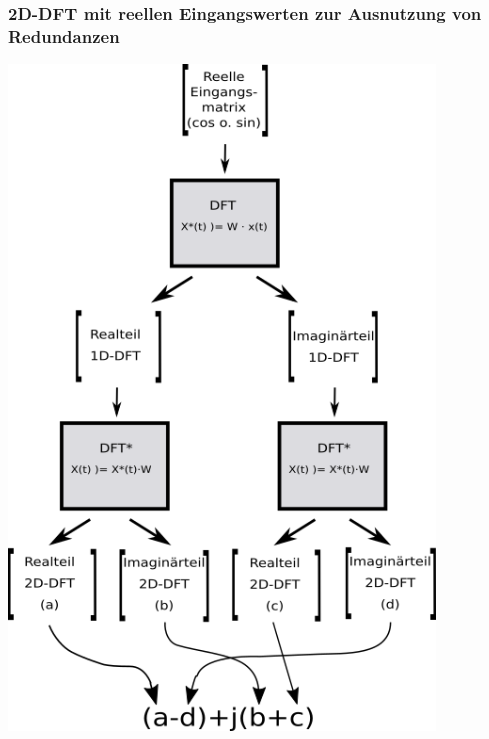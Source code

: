 \multipleframe
\begin{frame}\frametitle{2D-DFT mit reellen Eingangswerten zur Ausnutzung von Redundanzen}
\begin{minipage}{0.48\textwidth}
\begin{center}
 \includegraphics[width=0.85\textwidth]{img/reelleMatMult.png}
\end{center}
\end{minipage}
\hfill
\begin{minipage}{0.48\textwidth}
 
\end{minipage}
\end{frame}



